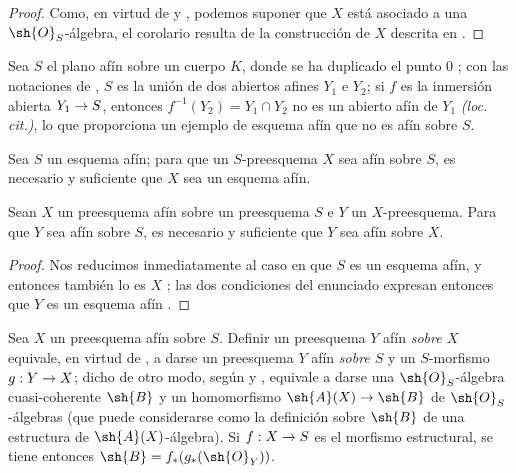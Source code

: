 \documentclass[oneside,10pt]{amsart}
\makeatletter
\newcommand{\ega@arrow}[2]{\mathchoice{#1}{#2}{#2}{#2}}
\renewcommand{\to}{\ega@arrow{\longrightarrow}{\rightarrow}}
\newcommand{\oldpage}[2][]{\marginnote{\normalfont\footnotesize\textbf{#1}~|~#2}\ignorespaces}
\let\EGAOriginalLabel\label
\renewcommand{\label}[1]{\phantomsection\EGAOriginalLabel{#1}}
\makeatother
\begin{document}
\begin{proof}
\oldpage[II]{9}
Como, en virtud de  y , podemos suponer que $X$ está asociado a una $\sh{O}_S$-álgebra, el corolario resulta de la construcción de $X$ descrita en .
\end{proof}

\begin{example}[1.3.3]
\label{II.1.3.3}
Sea $S$ el plano afín sobre un cuerpo $K$, donde se ha duplicado el punto $0$ ; con las notaciones de , $S$ es la unión de dos abiertos afines $Y_1$ e $Y_2$; si $f$ es la inmersión abierta $Y_1\to S$, entonces $f^{-1}(Y_2)=Y_1\cap Y_2$ no es un abierto afín de $Y_1$ \emph{(loc. cit.)}, lo que proporciona un ejemplo de esquema afín que no es afín sobre $S$.
\end{example}

\begin{corollary}[1.3.4]
\label{II.1.3.4}
Sea $S$ un esquema afín; para que un $S$-preesquema $X$ sea afín sobre $S$, es necesario y suficiente que $X$ sea un esquema afín.
\end{corollary}

\begin{corollary}[1.3.5]
\label{II.1.3.5}
Sean $X$ un preesquema afín sobre un preesquema $S$ e $Y$ un $X$-preesquema.
Para que $Y$ sea afín sobre $S$, es necesario y suficiente que $Y$ sea afín sobre $X$.
\end{corollary}

\begin{proof}
Nos reducimos inmediatamente al caso en que $S$ es un esquema afín, y entonces también lo es $X$ ; las dos condiciones del enunciado expresan entonces que $Y$ es un esquema afín .
\end{proof}

\begin{env}[1.3.6]
\label{II.1.3.6}
Sea $X$ un preesquema afín sobre $S$.
Definir un preesquema $Y$ afín \emph{sobre $X$} equivale, en virtud de , a darse un preesquema $Y$ afín \emph{sobre $S$} y un $S$-morfismo $g:Y\to X$; dicho de otro modo, según  y , equivale a darse una $\sh{O}_S$-álgebra cuasi-coherente $\sh{B}$ y un homomorfismo $\sh{A}(X)\to\sh{B}$ de $\sh{O}_S$-álgebras (que puede considerarse como la definición sobre $\sh{B}$ de una estructura de $\sh{A}(X)$-álgebra).
Si $f:X\to S$ es el morfismo estructural, se tiene entonces $\sh{B}=f_*(g_*(\sh{O}_Y))$.
\end{env}
\end{document}
